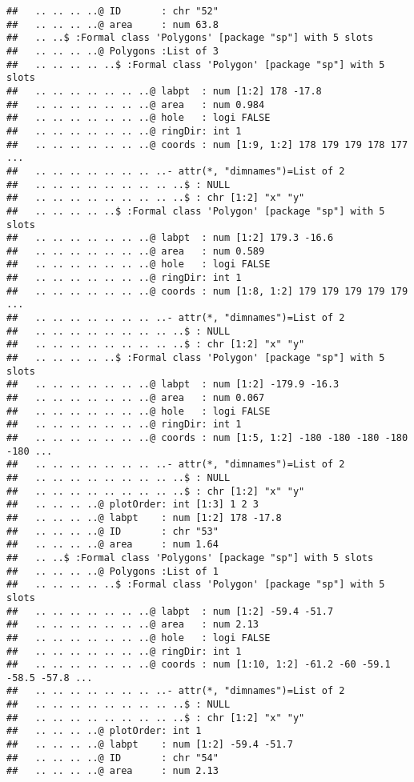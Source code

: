 \documentclass[]{article}
\begin{document}
\begin{verbatim}
##   .. .. .. ..@ ID       : chr "52"
##   .. .. .. ..@ area     : num 63.8
##   .. ..$ :Formal class 'Polygons' [package "sp"] with 5 slots
##   .. .. .. ..@ Polygons :List of 3
##   .. .. .. .. ..$ :Formal class 'Polygon' [package "sp"] with 5 slots
##   .. .. .. .. .. .. ..@ labpt  : num [1:2] 178 -17.8
##   .. .. .. .. .. .. ..@ area   : num 0.984
##   .. .. .. .. .. .. ..@ hole   : logi FALSE
##   .. .. .. .. .. .. ..@ ringDir: int 1
##   .. .. .. .. .. .. ..@ coords : num [1:9, 1:2] 178 179 179 178 177 ...
##   .. .. .. .. .. .. .. ..- attr(*, "dimnames")=List of 2
##   .. .. .. .. .. .. .. .. ..$ : NULL
##   .. .. .. .. .. .. .. .. ..$ : chr [1:2] "x" "y"
##   .. .. .. .. ..$ :Formal class 'Polygon' [package "sp"] with 5 slots
##   .. .. .. .. .. .. ..@ labpt  : num [1:2] 179.3 -16.6
##   .. .. .. .. .. .. ..@ area   : num 0.589
##   .. .. .. .. .. .. ..@ hole   : logi FALSE
##   .. .. .. .. .. .. ..@ ringDir: int 1
##   .. .. .. .. .. .. ..@ coords : num [1:8, 1:2] 179 179 179 179 179 ...
##   .. .. .. .. .. .. .. ..- attr(*, "dimnames")=List of 2
##   .. .. .. .. .. .. .. .. ..$ : NULL
##   .. .. .. .. .. .. .. .. ..$ : chr [1:2] "x" "y"
##   .. .. .. .. ..$ :Formal class 'Polygon' [package "sp"] with 5 slots
##   .. .. .. .. .. .. ..@ labpt  : num [1:2] -179.9 -16.3
##   .. .. .. .. .. .. ..@ area   : num 0.067
##   .. .. .. .. .. .. ..@ hole   : logi FALSE
##   .. .. .. .. .. .. ..@ ringDir: int 1
##   .. .. .. .. .. .. ..@ coords : num [1:5, 1:2] -180 -180 -180 -180 -180 ...
##   .. .. .. .. .. .. .. ..- attr(*, "dimnames")=List of 2
##   .. .. .. .. .. .. .. .. ..$ : NULL
##   .. .. .. .. .. .. .. .. ..$ : chr [1:2] "x" "y"
##   .. .. .. ..@ plotOrder: int [1:3] 1 2 3
##   .. .. .. ..@ labpt    : num [1:2] 178 -17.8
##   .. .. .. ..@ ID       : chr "53"
##   .. .. .. ..@ area     : num 1.64
##   .. ..$ :Formal class 'Polygons' [package "sp"] with 5 slots
##   .. .. .. ..@ Polygons :List of 1
##   .. .. .. .. ..$ :Formal class 'Polygon' [package "sp"] with 5 slots
##   .. .. .. .. .. .. ..@ labpt  : num [1:2] -59.4 -51.7
##   .. .. .. .. .. .. ..@ area   : num 2.13
##   .. .. .. .. .. .. ..@ hole   : logi FALSE
##   .. .. .. .. .. .. ..@ ringDir: int 1
##   .. .. .. .. .. .. ..@ coords : num [1:10, 1:2] -61.2 -60 -59.1 -58.5 -57.8 ...
##   .. .. .. .. .. .. .. ..- attr(*, "dimnames")=List of 2
##   .. .. .. .. .. .. .. .. ..$ : NULL
##   .. .. .. .. .. .. .. .. ..$ : chr [1:2] "x" "y"
##   .. .. .. ..@ plotOrder: int 1
##   .. .. .. ..@ labpt    : num [1:2] -59.4 -51.7
##   .. .. .. ..@ ID       : chr "54"
##   .. .. .. ..@ area     : num 2.13

\end{verbatim}
\end{document}
